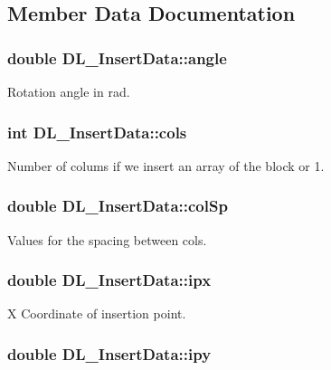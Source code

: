 \subsection{Member Data Documentation}
\hypertarget{structDL__InsertData_ad7e66cd816c2ee74fbcc32f24789f335}{
\subsubsection[{angle}]{\setlength{\rightskip}{0pt plus 5cm}double D\-L\-\_\-\-Insert\-Data\-::angle}}\label{structDL__InsertData_ad7e66cd816c2ee74fbcc32f24789f335}
Rotation angle in rad. \hypertarget{structDL__InsertData_a88b9829b19d977ef1845927e0c316cd0}{
\subsubsection[{cols}]{\setlength{\rightskip}{0pt plus 5cm}int D\-L\-\_\-\-Insert\-Data\-::cols}}\label{structDL__InsertData_a88b9829b19d977ef1845927e0c316cd0}
Number of colums if we insert an array of the block or 1. \hypertarget{structDL__InsertData_ad4e8ba5a5594c095459196304143a406}{
\subsubsection[{col\-Sp}]{\setlength{\rightskip}{0pt plus 5cm}double D\-L\-\_\-\-Insert\-Data\-::col\-Sp}}\label{structDL__InsertData_ad4e8ba5a5594c095459196304143a406}
Values for the spacing between cols. \hypertarget{structDL__InsertData_aa121a1cac14afd89d3043deefe118330}{
\subsubsection[{ipx}]{\setlength{\rightskip}{0pt plus 5cm}double D\-L\-\_\-\-Insert\-Data\-::ipx}}\label{structDL__InsertData_aa121a1cac14afd89d3043deefe118330}
X Coordinate of insertion point. \hypertarget{structDL__InsertData_a4a02e2c86a73ee0a812fd8ec4e8958a6}{
\subsubsection[{ipy}]{\setlength{\rightskip}{0pt plus 5cm}double D\-L\-\_\-\-Insert\-Data\-::ipy}}\label{structDL__InsertData_a4a02e2c86a73ee0a812fd8ec4e8958a6}

